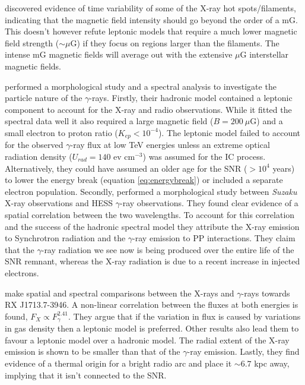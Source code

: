 \documentclass[12pt,a4paper]{article}
\begin{document}
\cite{2007Natur.449..576U} discovered evidence of time variability of some of the X-ray hot spots/filaments, indicating that the magnetic field intensity should go beyond the order of a mG. This doesn't however refute leptonic models that require a much lower magnetic field strength ($\sim \mu$G) if they focus on regions larger than the filaments. The intense mG magnetic fields will average out with the extensive $\mu$G interstellar magnetic fields.


\cite{2008ApJ...685..988T} performed a morphological study and a spectral analysis to investigate the particle nature of the $\gamma$-rays. Firstly, their hadronic model contained a leptonic component to account for the X-ray and radio observations. While it fitted the spectral data well it also required a large magnetic field ($B = 200 \ \mu$G) and a small electron to proton ratio ($K_{ep} < 10^{-4}$). The leptonic model failed to account for the observed $\gamma$-ray flux at low TeV energies unless an extreme optical radiation density ($U_{rad} = 140$ ev cm$^{-3}$) was assumed for the IC process. Alternatively, they could have assumed an older age for the SNR ($>10^4$ years) to lower the energy break (equation \ref{eq:energybreak}) or included a separate electron population. Secondly, \cite{2008ApJ...685..988T} performed a morphological study between \textit{Suzaku} X-ray observations and HESS $\gamma$-ray observations. They found clear evidence of a spatial correlation between the two wavelengths. To account for this correlation and the success of the hadronic spectral model they attribute the X-ray emission to Synchrotron radiation and the $\gamma$-ray emission to PP interactions. They claim that the $\gamma$-ray radiation we see now is being produced over the entire life of the SNR remnant, whereas the X-ray radiation is due to a recent increase in injected electrons.

\cite{2009A&A...505..157A} make spatial and spectral comparisons between the X-rays and $\gamma$-rays towards RX J1713.7-3946. A non-linear correlation between the fluxes at both energies is found, $F_X \propto F_{\gamma}^{2.41}$. They argue that if the variation in flux is caused by variations in gas density then a leptonic model is preferred. Other results also lead them to favour a leptonic model over a hadronic model. The radial extent of the X-ray emission is shown to be smaller than that of the $\gamma$-ray emission. Lastly, they find evidence of a thermal origin for a bright radio arc and place it $\sim6.7$ kpc away, implying that it isn't connected to the SNR. 
\end{document}

